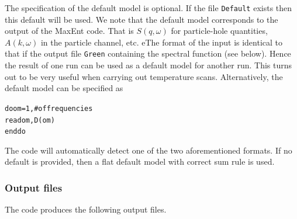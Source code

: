 The  specification of the  default model is optional.   If the file  \texttt{Default}  exists  then this  default  will be   used.  We note that the default model  corresponds to the output of the MaxEnt code. That is $S(q,\omega)$ for particle-hole quantities,  $A(k,\omega)$ in the particle channel, etc. eThe  format 
of  the input is identical  to that if  the output file   \texttt{Green} containing  the spectral function (see  below). Hence  
the  result of  one  run  can  be  used  as  a default model   for  another  run.  This turns out  to be  very  useful
when  carrying out  temperature  scans.  Alternatively,  the    default  model  can be  specified  as 
\begin{alltt}
do om = 1, # of  frequencies
  read  om, D(om)
enddo
\end{alltt}
The  code  will  automatically  detect  one of the  two aforementioned formats. If  no  default  is  provided, 
then  a  flat default model  with  correct  sum rule  is   used.    


\subsubsection*{Output files}

The code produces the following output files. 

